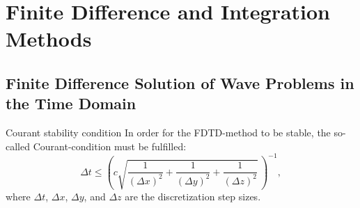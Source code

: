 \section{Finite Difference and Integration Methods}

\subsection{Finite Difference Solution of Wave Problems in the Time Domain}
\begin{info}{Courant stability condition}
  In order for the FDTD-method to be stable, the so-called Courant-condition must be fulfilled:
  \begin{equation*}
    \Delta t \leq \left(c\sqrt{\dfrac{1}{(\Delta x)^{2}} + \dfrac{1}{(\Delta y)^{2}} + \dfrac{1}{(\Delta z)^{2}}}\,\right)^{-1},
  \end{equation*}
  where $\Delta t$, $\Delta x$, $\Delta y$, and $\Delta z$ are the discretization step sizes.
\end{info}

